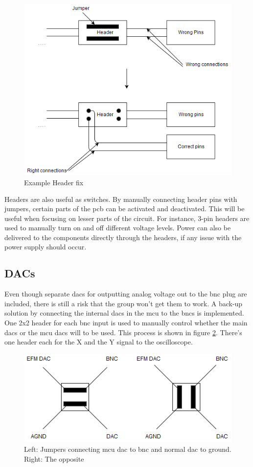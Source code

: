 \begin{figure}[h!]
\centering
\includegraphics[scale = 0.57]{images/Header_fix.png}
\caption{Example Header fix}
\label{fig:Header fix}
\end{figure}

Headers are also useful as switches.
By manually connecting header pins with jumpers, certain parts of the \gls{pcb} can be activated and deactivated.
This will be useful when focusing on lesser parts of the circuit.
For instance, 3-pin headers are used to manually turn on and off different voltage levels.
Power can also be delivered to the components directly through the headers, if any issue with the power supply should occur.

\subsection{DACs}
Even though separate \gls{dac}s for outputting analog voltage out to the \gls{bnc} plug are included, there is still a risk that the group won't get them to work.
A back-up solution by connecting the internal \gls{dac}s in the \gls{mcu} to the \gls{bnc}s is implemented.
One 2x2 header for each \gls{bnc} input is used to manually control whether the main \gls{dac}s or the \gls{mcu} \gls{dac}s will to be used.
This process is shown in figure \ref{fig:DAC headers}.
There's one header each for the X and the Y signal to the oscilloscope.

\begin{figure}[h!]
\centering
\includegraphics[scale = 0.6]{images/DAC_headers.png}
\caption{Left: Jumpers connecting \gls{mcu} \gls{dac} to \gls{bnc} and normal \gls{dac} to ground. Right: The opposite}
\label{fig:DAC headers}
\end{figure}
